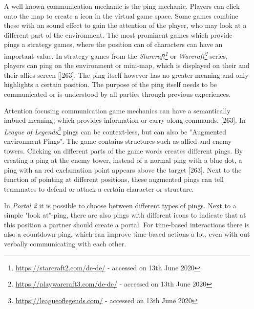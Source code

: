 A well known communication mechanic is the ping mechanic. Players can click onto the map to create a icon in the virtual game space. Some games combine these with an sound effect to gain the attention of the player, who may look at a different part of the environment.
The most prominent games which provide pings a strategy games, where the position can of characters can have an important value. In strategy games from the \textit{Starcraft\footnote{\url{https://starcraft2.com/de-de/} - accessed on 13th June 2020}} or \textit{Warcraft\footnote{\url{https://playwarcraft3.com/de-de/} - accessed on 13th June 2020}} series, players can ping on the environment or mini-map, which is displayed on their and their allies screen \autocite{Toups2014ATheory}[]263]. The ping itself however has no greater meaning and only highlights a certain position. The purpose of the ping itself needs to be communicated or is understood by all parties through previous experiences.


Attention focusing communication game mechanics can have a semantically imbued meaning, which provides information or carry along commands. \autocite{Toups2014ATheory}[263].
In \textit{League of Legends\footnote{\url{https://leagueoflegends.com/} - accessed on 13th June 2020}} pings can be context-less, but can also be "Augmented environment Pings". The game contains structures such as allied and enemy towers. Clicking on different parts of the game words creates different pings. By creating a ping at the enemy tower, instead of a normal ping with a blue dot, a ping with an red exclamation point appears above the target \autocite{Toups2014ATheory}[263]. Next to the function of pointing at different positions, these augmented pings can tell teammates to defend or attack a certain character or structure.

In \textit{Portal 2} it is possible to choose between different types of pings. Next to a simple "look at"-ping, there are also pings with different icons to indicate that at this position a partner should create a portal. For time-based interactions there is also a countdown-ping, which can improve time-based actions a lot, even with out verbally communicating with each other.